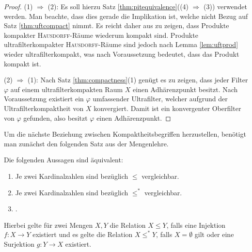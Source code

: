 \begin{proof}
  (1)  $\Rightarrow$  (2):
  Es soll hierzu Satz \ref{thm:pitequivalence}((4) $\Rightarrow$ (3)) verwendet werden.
  Man beachte, dass dies gerade die Implikation ist, welche nicht Bezug auf Satz \ref{thm:uftcompact} nimmt.
  Es reicht daher aus zu zeigen, dass Produkte kompakter \textsc{Hausdorff}\hyp{}Räume wiederum kompakt sind. 
  Produkte ultrafilterkompakter \textsc{Hausdorff}\hyp{}Räume sind jedoch nach Lemma \ref{lem:uftprod} wieder ultrafilterkompakt, was nach Voraussetzung bedeutet, dass das Produkt kompakt ist.

  (2) $\Rightarrow$ (1):
  Nach Satz \ref{thm:compactness}(1) genügt es zu zeigen, dass jeder Filter $\varphi$ auf einem ultrafilterkompakten Raum $X$ einen Adhärenzpunkt besitzt.
  Nach Voraussetzung existiert ein $\varphi$ umfassender Ultrafilter, welcher aufgrund der Ultrafilterkompaktheit von $X$ konvergiert.
  Damit ist ein konvergenter Oberfilter von $\varphi$ gefunden, also besitzt $\varphi$ einen Adhärenzpunkt.
\end{proof}

Um die nächste Beziehung zwischen Kompaktheitsbegriffen herzustellen, benötigt man zunächst den folgenden Satz aus der Mengenlehre.

\begin{thm}
  \label{thm:comparablecardinal}
  Die folgenden Aussagen sind äquivalent:
  \begin{enumerate}[(1)]
    \item Je zwei Kardinalzahlen sind bezüglich $\leq$ vergleichbar.
    \item Je zwei Kardinalzahlen sind bezüglich $\leq^*$ vergleichbar.
    \item \AC.
  \end{enumerate}
  Hierbei gelte für zwei Mengen $X,Y$ die Relation $X \leq Y$, falls eine Injektion $f \colon X \to Y$ existiert und es gelte die Relation $X \leq^* Y$, falls $X = \emptyset$ gilt oder eine Surjektion $g \colon Y \to X$ existiert.
\end{thm}

